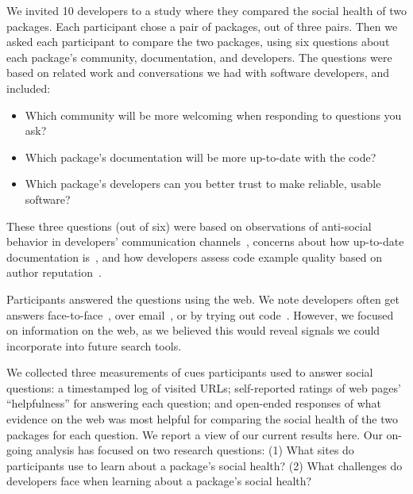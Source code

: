 We invited 10 developers to a study where they compared the social health of two packages.
Each participant chose a pair of packages, out of three pairs.
Then we asked each participant to compare the two packages, using six questions about each package's community, documentation, and developers.
The questions were based on related work and conversations we had with software developers, and included:
\begin{itemize}
\setlength{\itemsep}{0pt}
\setlength{\parskip}{0pt}
\setlength{\parsep}{0pt}  
\item Which community will be more welcoming when responding to questions you ask?
\item Which package's documentation will be more up-to-date with the code?
\item Which package's developers can you better trust to make reliable, usable software?
\end{itemize}
These three questions (out of six) were based on observations of anti-social behavior in developers' communication channels~\cite{storey_revolution_2014}, concerns about how up-to-date documentation is~\cite{lethbridge_how_2003,nykaza_what_2002,robillard_field_2011,storey_revolution_2014}, and how developers assess code example quality based on author reputation~\cite{robillard_field_2011}.

Participants answered the questions using the web.
We note developers often get answers face-to-face~\cite{latoza_maintaining_2006,storey_revolution_2014}, over email~\cite{ko_information_2007,latoza_maintaining_2006}, or by trying out code~\cite{brandt_two_2009}.
However, we focused on information on the web, as we believed this would reveal signals we could incorporate into future search tools.

We collected three measurements of cues participants used to answer social questions:
a timestamped log of visited URLs;
self-reported ratings of web pages' ``helpfulness'' for answering each question;
and open-ended responses of what evidence on the web was most helpful for comparing the social health of the two packages for each question.
We report a view of our current results here.
Our on-going analysis has focused on two research questions:
(1) What sites do participants use to learn about a package's social health?
(2) What challenges do developers face when learning about a package's social health?


